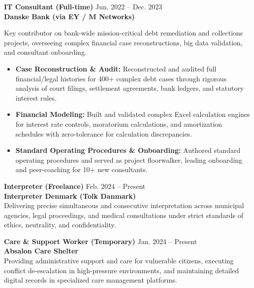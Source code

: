 \documentclass[9.5pt,a4paper]{article}
\begin{document}
\textbf{\fontsize{9.5}{11.5}\selectfont IT Consultant (Full-time)} \hfill {\fontsize{8.5}{10.5}\selectfont\color{mutedgray}Jun. 2022 -- Dec. 2023} \\
{\fontsize{8.5}{10.5}\selectfont\textbf{\color{accent}Danske Bank (via EY / M Networks)}} \\[2pt]
{\fontsize{8.5}{11}\selectfont\color{darkslate}
Key contributor on bank-wide mission-critical debt remediation and collections projects, overseeing complex financial case reconstructions, big data validation, and consultant onboarding.
\begin{itemize}
    \item \textbf{Case Reconstruction \& Audit:} Reconstructed and audited full financial/legal histories for 400+ complex debt cases through rigorous analysis of court filings, settlement agreements, bank ledgers, and statutory interest rules.
    \item \textbf{Financial Modeling:} Built and validated complex Excel calculation engines for interest rate controls, moratorium calculations, and amortization schedules with zero-tolerance for calculation discrepancies.
    \item \textbf{Standard Operating Procedures \& Onboarding:} Authored standard operating procedures and served as project floorwalker, leading onboarding and peer-coaching for 10+ new consultants.
\end{itemize}
}

\vspace{3pt}

\textbf{\fontsize{9.5}{11.5}\selectfont Interpreter (Freelance)} \hfill {\fontsize{8.5}{10.5}\selectfont\color{mutedgray}Feb. 2024 -- Present} \\
{\fontsize{8.5}{10.5}\selectfont\textbf{\color{accent}Interpreter Denmark (Tolk Danmark)}} \\[2pt]
{\fontsize{8.5}{11}\selectfont\color{darkslate}
Delivering precise simultaneous and consecutive interpretation across municipal agencies, legal proceedings, and medical consultations under strict standards of ethics, neutrality, and confidentiality.
}

\vspace{3pt}

\textbf{\fontsize{9.5}{11.5}\selectfont Care \& Support Worker (Temporary)} \hfill {\fontsize{8.5}{10.5}\selectfont\color{mutedgray}Jan. 2024 -- Present} \\
{\fontsize{8.5}{10.5}\selectfont\textbf{\color{accent}Absalon Care Shelter}} \\[2pt]
{\fontsize{8.5}{11}\selectfont\color{darkslate}
Providing administrative support and care for vulnerable citizens, executing conflict de-escalation in high-pressure environments, and maintaining detailed digital records in specialized care management platforms.
}
\end{document}
